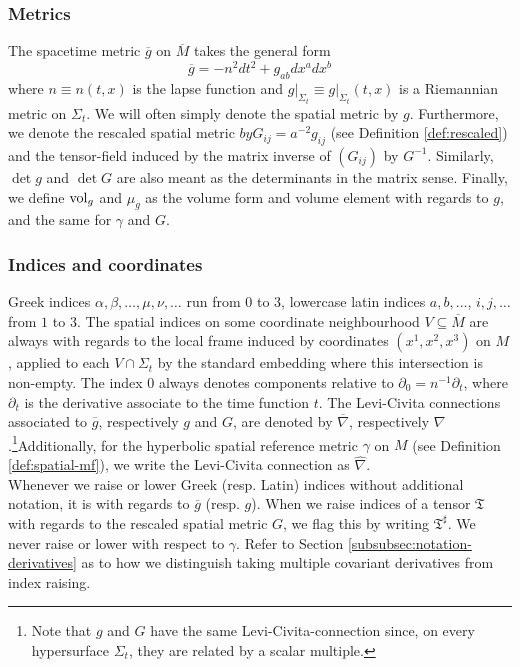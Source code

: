 \documentclass[11pt,leqno,textwidth=10cm]{amsart}
\numberwithin{equation}{section}
\theoremstyle{definition}
\theoremstyle{plain}
\newcommand{\1}{\mathbbm{1}}
\newcommand{\g}{\overline{g}}
\newcommand{\M}{\overline{M}}
\newcommand{\nabbar}{\overline{\nabla}}
\newcommand{\vol}[1]{{\text{\normalfont{vol}}}_{#1}}
\newcommand{\del}{\partial}
\newcommand{\nabhat}{\hat{\nabla}}
\newcommand{\change}[1]{\color{black}#1\color{black}}
\begin{document}
\subsubsection{Metrics}\label{subsubsec:notation-metric}

The spacetime metric $\g$ on $\M$ takes the general form
\[\g=-n^2dt^2+g_{ab}dx^adx^b\]
where $n\equiv n(t,x)$ is the lapse function and $g\vert_{\Sigma_t}\equiv g\vert_{\Sigma_t}(t,x)$ is a Riemannian metric on $\Sigma_t$. We will often simply denote the spatial metric by $g$. Furthermore, we denote the rescaled spatial metric \change{$by G_{ij}=a^{-2}g_{ij}$ (see Definition \ref{def:rescaled}) }and the tensor-field induced by the matrix inverse of $(G_{ij})$ by $G^{-1}$. Similarly, $\det g$ and $\det G$ are also meant as the determinants in the matrix sense. Finally, we define $\vol{g}$ and $\mu_g$ as the volume form and volume element with regards to $g$, and the same for $\gamma$ and $G$.

\subsubsection{Indices and coordinates}\label{subsubsec:notation-indices}

Greek indices $\alpha,\beta,\dots,\mu,\nu,\dots$ run from $0$ to $3$, lowercase latin indices $a,b,\dots$, $i,j,\dots$ from $1$ to $3$. The spatial indices on some coordinate neighbourhood $V\subseteq\M$ are always with regards to the local frame induced by coordinates $(x^1,x^2,x^3)$ on $M$, applied to each $V\cap\Sigma_t$ by the standard embedding where this intersection is non-empty. The index $0$ always denotes components relative to $\del_0=n^{-1}\del_t$, where $\del_t$ is the derivative associate to the time function $t$. The Levi-Civita connections associated to $\g$, respectively $g$ and $G$, are denoted by $\nabbar$, respectively $\nabla$.\footnote{Note that $g$ and $G$ have the same Levi-Civita-connection since, on every hypersurface $\Sigma_t$, they are related by a scalar multiple. }Additionally, for the hyperbolic spatial reference metric $\gamma$ on $M$ (see  Definition \ref{def:spatial-mf}), we write the Levi-Civita connection as $\nabhat$.\\

Whenever we raise or lower Greek (resp. Latin) indices without additional notation, it is with regards to $\g$ (resp. $g$). When we raise indices of a tensor $\mathfrak{T}$ with regards to the rescaled spatial metric $G$, we flag this by writing $\mathfrak{T}^\sharp$. We never raise or lower with respect to $\gamma$. Refer to Section \ref{subsubsec:notation-derivatives} as to how we distinguish taking multiple covariant derivatives from index raising.
\end{document}
